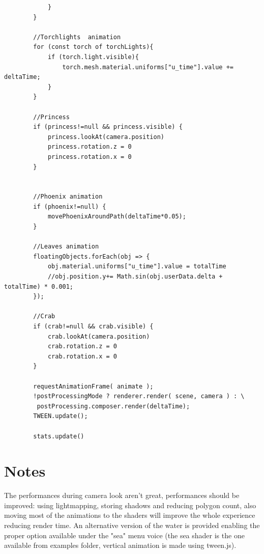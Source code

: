 \documentclass[10pt,a4paper]{article}
\begin{document}
\begin{verbatim}
            }
        }

        //Torchlights  animation
        for (const torch of torchLights){
            if (torch.light.visible){
                torch.mesh.material.uniforms["u_time"].value += deltaTime;
            }
        }

        //Princess
        if (princess!=null && princess.visible) {
            princess.lookAt(camera.position)
            princess.rotation.z = 0
            princess.rotation.x = 0
        }

       
        //Phoenix animation
        if (phoenix!=null) {
            movePhoenixAroundPath(deltaTime*0.05);
        }

        //Leaves animation
        floatingObjects.forEach(obj => {
            obj.material.uniforms["u_time"].value = totalTime
            //obj.position.y+= Math.sin(obj.userData.delta + totalTime) * 0.001;
        });

        //Crab
        if (crab!=null && crab.visible) {
            crab.lookAt(camera.position)
            crab.rotation.z = 0
            crab.rotation.x = 0
        }

        requestAnimationFrame( animate );
        !postProcessingMode ? renderer.render( scene, camera ) : \
         postProcessing.composer.render(deltaTime);
        TWEEN.update();

        stats.update()
\end{verbatim}

\section{Notes}

The performances during camera look aren't great, performances should be improved: using lightmapping, storing shadows and reducing polygon count, also moving most of  the animations to  the shaders will improve the  whole experience reducing render time. An alternative version of the water is provided enabling the proper option available under the "sea" menu voice (the sea shader  is the one available from examples folder, vertical animation is made using tween.js).
\end{document}
